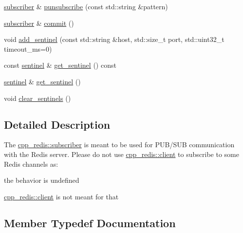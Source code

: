 \begin{DoxyCompactItemize}
\mbox{\hyperlink{classcpp__redis_1_1subscriber}{subscriber}} \& \mbox{\hyperlink{classcpp__redis_1_1subscriber_a26edc7dcf87ddc8734fac04878ca307a}{punsubscribe}} (const std\+::string \&pattern)
\item 
\mbox{\hyperlink{classcpp__redis_1_1subscriber}{subscriber}} \& \mbox{\hyperlink{classcpp__redis_1_1subscriber_af78a5542315daac42998809eeec30eef}{commit}} ()
\item 
void \mbox{\hyperlink{classcpp__redis_1_1subscriber_a2faf9e9cc9c95e3c0fed148355af84f1}{add\+\_\+sentinel}} (const std\+::string \&host, std\+::size\+\_\+t port, std\+::uint32\+\_\+t timeout\+\_\+ms=0)
\item 
const \mbox{\hyperlink{classcpp__redis_1_1sentinel}{sentinel}} \& \mbox{\hyperlink{classcpp__redis_1_1subscriber_a0a6212dfba0513508fdc6377f83a0048}{get\+\_\+sentinel}} () const
\item 
\mbox{\hyperlink{classcpp__redis_1_1sentinel}{sentinel}} \& \mbox{\hyperlink{classcpp__redis_1_1subscriber_a4a77354e12a6ef19cad7b0f55b62033c}{get\+\_\+sentinel}} ()
\item 
void \mbox{\hyperlink{classcpp__redis_1_1subscriber_a3f8119bc43a67f8e22369aad529444ba}{clear\+\_\+sentinels}} ()
\end{DoxyCompactItemize}


\subsection{Detailed Description}
The \mbox{\hyperlink{classcpp__redis_1_1subscriber}{cpp\+\_\+redis\+::subscriber}} is meant to be used for P\+U\+B/\+S\+UB communication with the Redis server. Please do not use \mbox{\hyperlink{classcpp__redis_1_1client}{cpp\+\_\+redis\+::client}} to subscribe to some Redis channels as\+:
\begin{DoxyItemize}
\item the behavior is undefined
\item \mbox{\hyperlink{classcpp__redis_1_1client}{cpp\+\_\+redis\+::client}} is not meant for that 
\end{DoxyItemize}

\subsection{Member Typedef Documentation}
\mbox{\label{classcpp__redis_1_1subscriber_a19ea39dfabeb19937a9ce4c8d21781b4}} 
